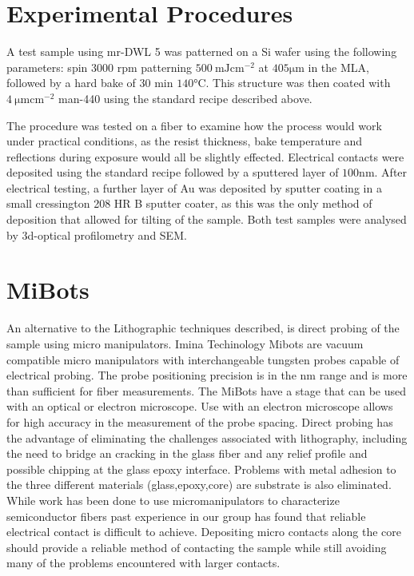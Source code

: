 \section{Experimental Procedures}
A test sample using mr-DWL 5 was patterned on a Si wafer using the following parameters: spin 3000 rpm patterning $\SI{500}{\milli \joule \cm^{-2}}$ at $405 \si{\micro\meter}$ in the MLA, followed by a hard bake of 30 min $140 \si{\celsius}$. This structure was then coated with $\SI{4}{\micro \meter \cm^{-2}}$ man-440 using the standard recipe described above. 

The procedure was tested on a fiber to examine how the process would work under practical conditions, as the resist thickness, bake temperature and reflections during exposure would all be slightly effected. Electrical contacts were deposited using the standard recipe followed by a sputtered layer of $100 \si{\nano \meter}$. After electrical testing, a further layer of Au was deposited by sputter coating in a small cressington 208 HR B sputter coater, as this was the only method of deposition that allowed for tilting of the sample. Both test samples were analysed by 3d-optical profilometry and SEM. 

\section{MiBots}
An alternative to the Lithographic techniques described, is direct probing of the sample using micro manipulators. Imina Techinology Mibots are vacuum compatible micro manipulators with interchangeable tungsten probes capable of electrical probing. The probe positioning precision is in the nm range and is more than sufficient for fiber measurements. The MiBots have a stage that can be used with an optical or electron microscope. Use with an electron microscope allows for high accuracy in the measurement of the probe spacing. Direct probing has the advantage of eliminating the challenges associated with lithography, including the need to bridge an cracking in the glass fiber and any relief profile and possible chipping at the glass epoxy interface. Problems with metal adhesion to the three different materials (glass,epoxy,core) are substrate is also eliminated. While work has been done to use micromanipulators to characterize semiconductor fibers \cite{Engel2016DirectPhotosynthesis} past experience in our group has found that reliable electrical contact is difficult to achieve. %
Depositing micro contacts along the core should provide a reliable method of contacting the sample while still avoiding many of the problems encountered with larger contacts.  



